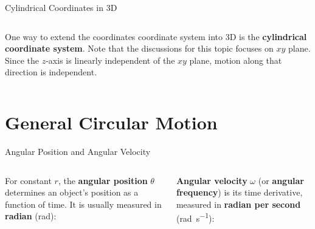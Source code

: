 \documentclass[12pt,compress,aspectratio=169]{beamer}
\begin{document}
\begin{frame}{Cylindrical Coordinates in 3D}
  \begin{columns}

    One way to extend the coordinates coordinate system into 3D is the
    \textbf{cylindrical coordinate system}. Note that the discussions for this
    topic focuses on $xy$ plane. Since the $z$-axis is linearly independent of
    the $xy$ plane, motion along that direction is independent.
  \end{columns}
\end{frame}



\section{General Circular Motion}

\begin{frame}{Angular Position and Angular Velocity}
  \vspace{.2in}
  \begin{columns}
    
    For constant $r$, the \textbf{angular position} $\theta$ determines an
    object's position as a function of time. It is usually measured in
    \textbf{radian} (\si{\radian}):

    
    \vspace{-.1in}\textbf{Angular velocity} $\omega$ (or \textbf{angular
      frequency}) is its time derivative, measured in \textbf{radian per second}
    (\si{\radian\per\second}):
      
  \end{columns}
\end{frame}
\end{document}
